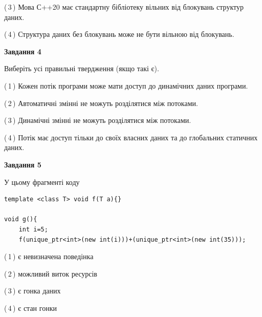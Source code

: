 \documentclass[12pt, ukrainian]{article}
\begin{document}
\begin {large}
{(\,3\,) Мова С++20 має стандартну бібліотеку вільних від блокувань структур даних.%

(\,4\,) Структура даних без блокувань може не бути вільною від блокувань.%



\begin{center}
\textbf{Завдання 4}
\end{center}
Виберіть усі правильні твердження (якщо такі є).\par
\vspace{2mm}

(\,1\,) Кожен потік програми може мати доступ до динамічних даних програми.%

(\,2\,) Автоматичні змінні не можуть розділятися між потоками.%

(\,3\,) Динамічні змінні не можуть розділятися між потоками.%

(\,4\,) Потік має доступ тільки до своїх власних даних та до глобальних статичних даних.%



\begin{center}
\textbf{Завдання 5}
\end{center}
У цьому фрагменті коду
\begin{verbatim}
template <class T> void f(T a){}

void g(){
    int i=5;
    f(unique_ptr<int>(new int(i)))+(unique_ptr<int>(new int(35)));
\end{verbatim}
(\,1\,) є невизначена поведінка%

(\,2\,) можливий виток ресурсів%

(\,3\,) є гонка даних%

(\,4\,) є стан гонки%


}
\end {large}
\end{document}
